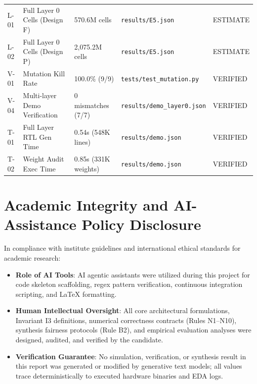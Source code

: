 \documentclass[11pt,a4paper]{article}
\begin{document}
\begin{table}[h!]
\begin{tabularx}{\linewidth}{lllXl}
L-01 & Full Layer 0 Cells (Design F)   & 570.6M cells & \texttt{results/E5.json} & ESTIMATE \\
L-02 & Full Layer 0 Cells (Design P)   & 2,075.2M cells & \texttt{results/E5.json} & ESTIMATE \\
V-01 & Mutation Kill Rate              & 100.0\% (9/9) & \texttt{tests/test\_mutation.py} & VERIFIED \\
V-04 & Multi-layer Demo Verification   & 0 mismatches (7/7) & \texttt{results/demo\_layer0.json} & VERIFIED \\
T-01 & Full Layer RTL Gen Time         & 0.54s (548K lines) & \texttt{results/demo.json} & VERIFIED \\
T-02 & Weight Audit Exec Time          & 0.85s (331K weights) & \texttt{results/demo.json} & VERIFIED \\
\bottomrule
\end{tabularx}
\end{table}

\section{Academic Integrity and AI-Assistance Policy Disclosure}
In compliance with institute guidelines and international ethical standards for academic research:
\begin{itemize}
    \item \textbf{Role of AI Tools}: AI agentic assistants were utilized during this project for code skeleton scaffolding, regex pattern verification, continuous integration scripting, and LaTeX formatting.
    \item \textbf{Human Intellectual Oversight}: All core architectural formulations, Invariant I3 definitions, numerical correctness contracts (Rules N1--N10), synthesis fairness protocols (Rule B2), and empirical evaluation analyses were designed, audited, and verified by the candidate.
    \item \textbf{Verification Guarantee}: No simulation, verification, or synthesis result in this report was generated or modified by generative text models; all values trace deterministically to executed hardware binaries and EDA logs.
\end{itemize}
\end{document}
